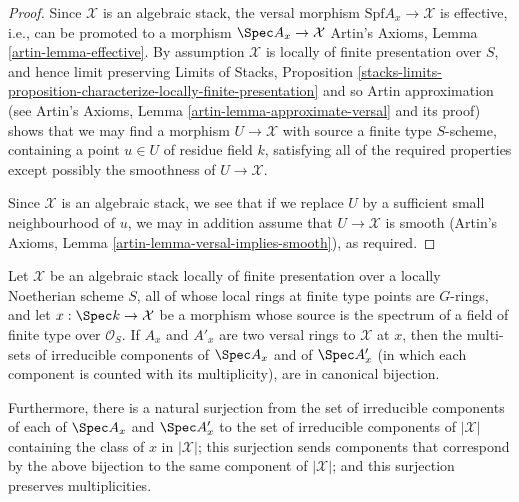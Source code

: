\begin{proof}
Since $\mathcal{X}$ is an algebraic stack,
the versal morphism $\text{Spf} A_x \to \mathcal{X}$ is effective,
i.e., can be promoted to a morphism $\Spec A_x \to \mathcal{X}$
Artin's Axioms, Lemma \ref{artin-lemma-effective}.
By assumption $\mathcal{X}$ is locally of finite presentation over $S$,
and hence limit preserving
Limits of Stacks, Proposition
\ref{stacks-limits-proposition-characterize-locally-finite-presentation}
and so Artin approximation
(see Artin's Axioms, Lemma \ref{artin-lemma-approximate-versal}
and its proof)
shows that we may find a morphism $U \to \mathcal{X}$ with source a finite type
$S$-scheme, containing a point $u \in U$ of residue field $k$,
satisfying all of the required properties except possibly the
smoothness of $U\to\mathcal{X}$.

\medskip\noindent
Since $\mathcal{X}$ is an algebraic stack, we see that if we replace
$U$ by a sufficient small neighbourhood of $u$, we may in addition
assume that $U \to \mathcal{X}$ is smooth
(Artin's Axioms, Lemma \ref{artin-lemma-versal-implies-smooth}), as required.
\end{proof}

\begin{lemma}
\label{lemma-branches}
Let $\mathcal{X}$ be an algebraic stack locally of finite presentation
over a locally Noetherian scheme $S$,
all of whose local rings at finite type points are $G$-rings,
and let $x: \Spec k \to \mathcal{X}$ be a morphism whose source is the spectrum
of a field of finite type over $\mathcal{O}_S$.
If $A_x$ and $A'_x$ are two versal rings to $\mathcal{X}$ at $x$,
then the multi-sets of irreducible components of $\Spec A_x$
and of $\Spec A'_x$
(in which each component is counted with its multiplicity),
are in canonical bijection.

\medskip\noindent
Furthermore, there is a natural surjection from the
set of irreducible components of each of $\Spec A_x$ and $\Spec A'_x$
to the set of irreducible components of $|\mathcal{X}|$ containing the
class of $x$ in $|\mathcal{X}|$; this surjection sends components
that correspond by the above bijection to the same component
of $|\mathcal{X}|$; and this surjection preserves multiplicities.
\end{lemma}

